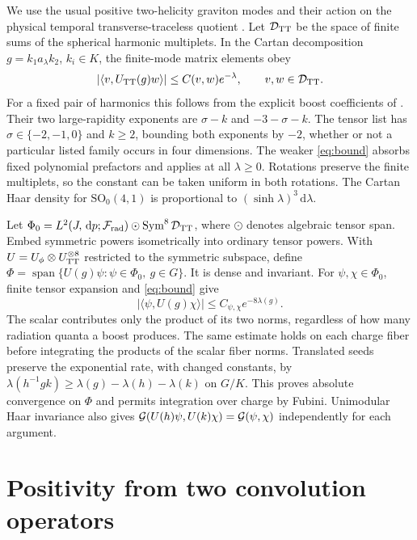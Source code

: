 \documentclass[11pt]{article}
\newcommand{\DD}{\mathcal D}
\newcommand{\FF}{\mathcal F}
\newcommand{\Sym}{\operatorname{Sym}}
\newcommand{\SO}{\mathrm{SO}}
\newcommand{\dd}{\,\mathrm d}
\numberwithin{equation}{section}
\begin{document}
We use the usual positive two-helicity graviton modes and their
action on the physical temporal transverse-traceless quotient
\cite[Secs.~3.3--3.4]{mmfree}. Let \(\DD_{\rm TT}\) be the
space of finite sums of the spherical harmonic multiplets.
In the Cartan decomposition \(g=k_1a_\lambda k_2\),
\(k_i\in K\), the finite-mode matrix elements obey
\begin{equation}
 |\langle v,U_{\rm TT}(g)w\rangle|
             \le C(v,w)e^{-\lambda},\qquad v,w\in\DD_{\rm TT}.
 \label{eq:bound}
\end{equation}
For a fixed pair of harmonics this follows from the explicit
boost coefficients of \cite[Eqs.~(36)--(42), (125)]{mmfree}.
Their two large-rapidity exponents are \(\sigma-k\) and
\(-3-\sigma-k\). The tensor list has \(\sigma\in\{-2,-1,0\}\)
and \(k\ge2\), bounding both exponents by \(-2\), whether
or not a particular listed family occurs in four dimensions.
The weaker \eqref{eq:bound} absorbs fixed polynomial prefactors
and applies at all \(\lambda\ge0\). Rotations preserve the finite multiplets,
so the constant can be taken uniform in both rotations.
The Cartan Haar density for \(\SO_0(4,1)\) is proportional to
\((\sinh\lambda)^3\dd\lambda\).

Let
\(\Phi_0=L^2(J,\dd p;\FF_{\rm rad})\odot\Sym^8\DD_{\rm TT}\),
where \(\odot\) denotes algebraic tensor span. Embed symmetric
powers isometrically into ordinary tensor powers.
With \(U=U_\phi\otimes U_{\rm TT}^{\otimes8}\) restricted to the
symmetric subspace, define
\(\Phi=\operatorname{span}\{U(g)\psi:\psi\in\Phi_0,\ g\in G\}\).
It is dense and invariant. For \(\psi,\chi\in\Phi_0\), finite tensor
expansion and \eqref{eq:bound} give
\[
 |\langle\psi,U(g)\chi\rangle|\le C_{\psi,\chi}
                                     e^{-8\lambda(g)}.
\]
The scalar contributes only the product of its two norms, regardless
of how many radiation quanta a boost produces.
The same estimate holds on each charge fiber before integrating
the products of the scalar fiber norms. Translated seeds preserve
the exponential rate, with changed constants, by
\(\lambda(h^{-1}gk)\ge\lambda(g)-\lambda(h)-\lambda(k)\)
on \(G/K\). This proves absolute convergence on \(\Phi\)
and permits integration over charge by Fubini. Unimodular Haar
invariance also gives
\({\cal G}(U(h)\psi,U(k)\chi)={\cal G}(\psi,\chi)\)
independently for each argument.

\section{Positivity from two convolution operators}
\end{document}
